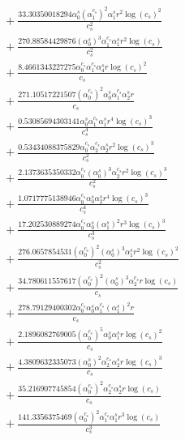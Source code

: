\documentclass[10pt]{article}
\begin{document}
\begin{align*}
&{}  + \frac{33.30350018294 \alpha_{0}^s \left(\alpha_{1}^{c_s}\right)^{2} \alpha_{1}^s r^{2} \log{\left(c_{s} \right)}^{2}}{c_{s}^{2}} \\
&{}  + \frac{270.88584429876 \left(\alpha_{0}^s\right)^{3} \alpha_{1}^{c_s} \alpha_{1}^s r^{2} \log{\left(c_{s} \right)}}{c_{s}^{2}} \\
&{}  + \frac{8.4661343227275 \alpha_{0}^{c_s} \alpha_{1}^{c_s} \alpha_{4}^s r \log{\left(c_{s} \right)}^{2}}{c_{s}} \\
&{}  + \frac{271.10517221507 \left(\alpha_{0}^{c_s}\right)^{2} \alpha_{0}^s \alpha_{1}^{c_s} \alpha_{2}^s r}{c_{s}} \\
&{}  + \frac{0.53085694303141 \alpha_{0}^s \alpha_{1}^{c_s} \alpha_{1}^s r^{4} \log{\left(c_{s} \right)}^{3}}{c_{s}^{4}} \\
&{}  + \frac{0.53434088375829 \alpha_{0}^{c_s} \alpha_{2}^{c_s} \alpha_{2}^s r^{2} \log{\left(c_{s} \right)}^{3}}{c_{s}^{2}} \\
&{}  + \frac{2.1373635350332 \alpha_{0}^{c_s} \left(\alpha_{0}^s\right)^{3} \alpha_{2}^{c_s} r^{2} \log{\left(c_{s} \right)}^{3}}{c_{s}^{2}} \\
&{}  + \frac{1.0717775138946 \alpha_{0}^{c_s} \alpha_{0}^s \alpha_{2}^s r^{4} \log{\left(c_{s} \right)}^{3}}{c_{s}^{4}} \\
&{}  + \frac{17.202530889274 \alpha_{0}^{c_s} \alpha_{0}^s \left(\alpha_{1}^s\right)^{2} r^{3} \log{\left(c_{s} \right)}^{3}}{c_{s}^{3}} \\
&{}  + \frac{276.0657854531 \left(\alpha_{0}^{c_s}\right)^{2} \left(\alpha_{0}^s\right)^{3} \alpha_{1}^s r^{2} \log{\left(c_{s} \right)}^{2}}{c_{s}^{2}} \\
&{}  + \frac{34.780611557617 \left(\alpha_{0}^{c_s}\right)^{2} \left(\alpha_{0}^s\right)^{3} \alpha_{2}^{c_s} r \log{\left(c_{s} \right)}}{c_{s}} \\
&{}  + \frac{278.79129400302 \alpha_{0}^{c_s} \alpha_{0}^s \alpha_{1}^{c_s} \left(\alpha_{1}^s\right)^{2} r}{c_{s}} \\
&{}  + \frac{2.1896082769005 \left(\alpha_{0}^{c_s}\right)^{5} \alpha_{0}^s \alpha_{1}^s r \log{\left(c_{s} \right)}^{2}}{c_{s}} \\
&{}  + \frac{4.3809632335073 \left(\alpha_{0}^s\right)^{2} \alpha_{2}^{c_s} \alpha_{2}^s r \log{\left(c_{s} \right)}^{3}}{c_{s}} \\
&{}  + \frac{35.216907745854 \left(\alpha_{0}^{c_s}\right)^{2} \alpha_{2}^{c_s} \alpha_{2}^s r \log{\left(c_{s} \right)}}{c_{s}} \\
&{}  + \frac{141.3356375469 \left(\alpha_{0}^{c_s}\right)^{2} \alpha_{1}^{c_s} \alpha_{1}^s r^{3} \log{\left(c_{s} \right)}}{c_{s}^{3}} \\

\end{align*}
\end{document}

